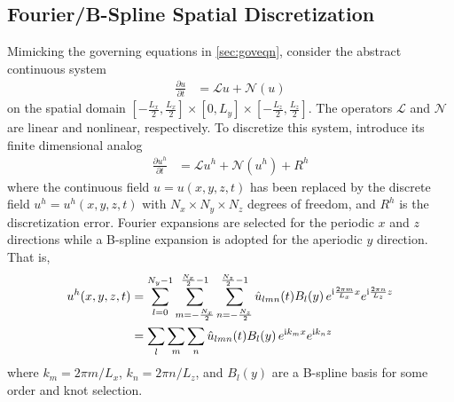 \subsection{Fourier/B-Spline Spatial Discretization}
\label{sec:spatialdiscretization}

Mimicking the governing equations in \autoref{sec:goveqn}, consider the abstract
continuous system
\begin{align}
  \frac{\partial\!u}{\partial\!t} &= \mathscr{L}u + \mathscr{N}\!\left(u\right)
\end{align}
on the spatial domain $\left[-\frac{L_x}{2},\frac{L_x}{2}\right] \times{}
[0,L_y] \times{} \left[-\frac{L_z}{2},\frac{L_z}{2}\right]$.  The operators
$\mathscr{L}$ and $\mathscr{N}$ are linear and nonlinear, respectively.
To discretize this system, introduce its finite dimensional analog
\begin{align}
  \frac{\partial\!u^h}{\partial\!t}
  &=
  \mathscr{L}u^h + \mathscr{N}\!\left(u^h\right) + R^h
  \label{eq:discrete_system_with_residual}
\end{align}
where the continuous field $u = u\!\left(x,y,z,t\right)$ has been replaced by the discrete
field $u^h = u^h\!\left(x,y,z,t\right)$ with $N_x\times{}N_y\times{}N_z$ degrees of
freedom, and $R^h$ is the discretization error.
Fourier expansions are selected for the periodic $x$ and $z$ directions while a
B-spline expansion is adopted for the aperiodic $y$ direction.  That is,
\begin{align}
u^h(x,y,z,t)
&=
  \sum_{l=0}^{N_y - 1}
  \sum_{m=-\frac{N_x}{2}}^{\frac{N_x}{2}-1}
  \sum_{n=-\frac{N_z}{2}}^{\frac{N_z}{2}-1}
  \hat{u}_{l m n}(t)
  B_l\!\left(y\right)
  e^{\mathrm{i}\frac{2\pi{}m}{L_x}x}
  e^{\mathrm{i}\frac{2\pi{}n}{L_z}z}
  \notag\\
&=
  \sum_{l}\sum_{m}\sum_{n}
  \hat{u}_{l m n}(t)B_l\!\left(y\right)e^{\mathrm{i} k_m x}e^{\mathrm{i} k_n z}
  \label{eq:u_h_expansion}
\end{align}
where $k_m = 2\pi{}m/L_x$, $k_n = 2\pi{}n/L_z$, and $B_l\!\left(y\right)$ are a
B-spline basis for some order and knot selection.

